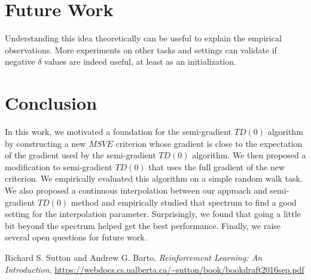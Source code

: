 \documentclass{article}
\begin{document}
\section{Future Work}
Understanding this idea theoretically can be useful to explain the empirical observations. More experiments on other tasks and settings can validate if negative $\delta$ values are indeed useful, at least as an initialization.


\section{Conclusion}
In this work, we motivated a foundation for the semi-gradient $TD(0)$ algorithm by constructing a new $MSVE$ criterion whose gradient is close to the expectation of the gradient used by the semi-gradient $TD(0)$ algorithm. We then proposed a modification to semi-gradient $TD(0)$ that uses the full gradient of the new criterion. We empirically evaluated this algorithm on a simple random walk task. We also proposed a continuous interpolation between our approach and semi-gradient $TD(0)$ method and empirically studied that spectrum to find a good setting for the interpolation parameter. Surprisingly, we found that going a little bit beyond the spectrum helped get the best performance. Finally, we raise several open questions for future work.
\clearpage

\begin{thebibliography}{9}

 Richard S. Sutton and Andrew G. Barto, \emph{Reinforcement Learning: An Introduction}, \url{https://webdocs.cs.ualberta.ca/~sutton/book/bookdraft2016sep.pdf}

\end{thebibliography}
\end{document}
